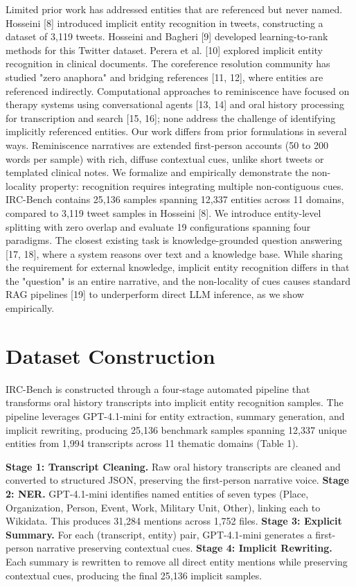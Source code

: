 ﻿\documentclass{article}
\begin{document}
Limited prior work has addressed entities that are referenced but never
named. Hosseini {[}8{]} introduced implicit entity recognition in
tweets, constructing a dataset of 3,119 tweets. Hosseini and Bagheri
{[}9{]} developed learning-to-rank methods for this Twitter dataset.
Perera et al. {[}10{]} explored implicit entity recognition in clinical
documents. The coreference resolution community has studied "zero
anaphora" and bridging references {[}11, 12{]}, where entities are
referenced indirectly. Computational approaches to reminiscence have
focused on therapy systems using conversational agents {[}13, 14{]} and
oral history processing for transcription and search {[}15, 16{]}; none
address the challenge of identifying implicitly referenced entities. Our
work differs from prior formulations in several ways. Reminiscence
narratives are extended first-person accounts (50 to 200 words per
sample) with rich, diffuse contextual cues, unlike short tweets or
templated clinical notes. We formalize and empirically demonstrate the
non-locality property: recognition requires integrating multiple
non-contiguous cues. IRC-Bench contains 25,136 samples spanning 12,337
entities across 11 domains, compared to 3,119 tweet samples in Hosseini
{[}8{]}. We introduce entity-level splitting with zero overlap and
evaluate 19 configurations spanning four paradigms. The closest existing
task is knowledge-grounded question answering {[}17, 18{]}, where a
system reasons over text and a knowledge base. While sharing the
requirement for external knowledge, implicit entity recognition differs
in that the "question" is an entire narrative, and the non-locality of
cues causes standard RAG pipelines {[}19{]} to underperform direct LLM
inference, as we show empirically.

\section{Dataset Construction}\label{dataset-construction}

IRC-Bench is constructed through a four-stage automated pipeline that
transforms oral history transcripts into implicit entity recognition
samples. The pipeline leverages GPT-4.1-mini for entity extraction,
summary generation, and implicit rewriting, producing 25,136 benchmark
samples spanning 12,337 unique entities from 1,994 transcripts across 11
thematic domains (Table 1).

\textbf{Stage 1: Transcript Cleaning.} Raw oral history transcripts are
cleaned and converted to structured JSON, preserving the first-person
narrative voice. \textbf{Stage 2: NER.} GPT-4.1-mini identifies named
entities of seven types (Place, Organization, Person, Event, Work,
Military Unit, Other), linking each to Wikidata. This produces 31,284
mentions across 1,752 files. \textbf{Stage 3: Explicit Summary.} For
each (transcript, entity) pair, GPT-4.1-mini generates a first-person
narrative preserving contextual cues. \textbf{Stage 4: Implicit
Rewriting.} Each summary is rewritten to remove all direct entity
mentions while preserving contextual cues, producing the final 25,136
implicit samples.
\end{document}

